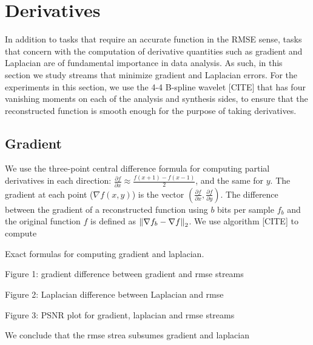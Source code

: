 \section{Derivatives}

In addition to tasks that require an accurate function in the RMSE sense, tasks that concern with
the computation of derivative quantities such as gradient and Laplacian are of fundamental
importance in data analysis. As such, in this section we study streams that minimize gradient and
Laplacian errors. For the experiments in this section, we use the 4-4 B-spline wavelet [CITE] that
has four vanishing moments on each of the analysis and synthesis sides, to ensure that the
reconstructed function is smooth enough for the purpose of taking derivatives.

\subsection{Gradient}

We use the three-point central difference formula for computing partial derivatives in each
direction: $\frac{\partial f}{\partial x}\approx \frac{f(x+1)-f(x-1)}{2}$, and the same for $y$. The
gradient at each point ($\nabla f(x,y)$) is the vector $(\frac{\partial f}{\partial
x},\frac{\partial f}{\partial y})$. The difference between the gradient of a reconstructed function
using $b$ bits per sample $f_b$ and the original function $f$ is defined as $\left\lVert\nabla f_b-\nabla f\right\rVert_2$. We use algorithm [CITE] to compute 

Exact formulas for computing gradient and laplacian.

Figure 1: gradient difference between gradient and rmse streams

Figure 2: Laplacian difference between Laplacian and rmse

Figure 3: PSNR plot for gradient, laplacian and rmse streams

We conclude that the rmse strea subsumes gradient and laplacian
